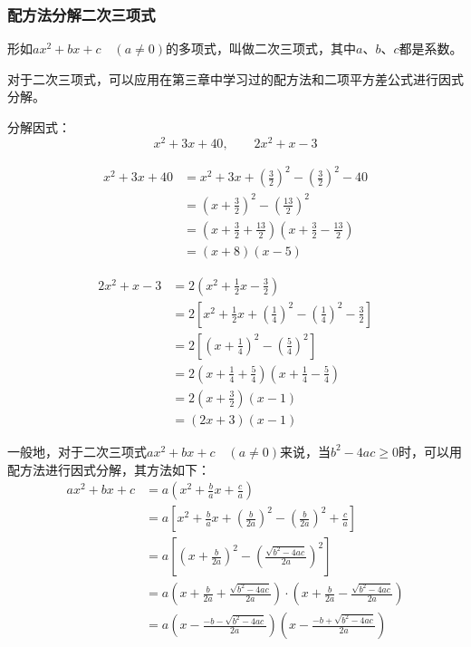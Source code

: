 \subsubsection{配方法分解二次三项式}
形如$ax^2+bx+c\quad (a\ne 0)$的多项式，叫做二次三项式，其中$a$、$b$、$c$都是系数。

对于二次三项式，可以应用在第三章中学习过的配方法和二项平方差公式进行因式分解。
\begin{example}
    分解因式：
\[x^2+3x+40,\qquad 2x^2+x-3\]
\end{example}

\begin{solution}
\[\begin{split}
    x^2+3x+40&=x^2+3x+\left(\frac{3}{2}\right)^2-\left(\frac{3}{2}\right)^2-40\\
    &=\left(x+\frac{3}{2}\right)^2-\left(\frac{13}{2}\right)^2\\
    &=\left(x+\frac{3}{2}+\frac{13}{2}\right)\left(x+\frac{3}{2}-\frac{13}{2}\right)\\
    &=(x+8)(x-5)
\end{split}\]

\[\begin{split}
    2x^2+x-3&=2\left(x^2+\frac{1}{2}x-\frac{3}{2}\right)\\
    &=2\left[x^2+\frac{1}{2}x+\left(\frac{1}{4}\right)^2-\left(\frac{1}{4}\right)^2-\frac{3}{2} \right]\\
    &=2\left[\left(x+\frac{1}{4}\right)^2-\left(\frac{5}{4}\right)^2\right]\\
    &=2\left(x+\frac{1}{4}+\frac{5}{4}\right)
   \left(x+\frac{1}{4}-\frac{5}{4}\right) \\
&=2\left(x+\frac{3}{2}\right)\left(x-1\right)\\
&=(2x+3)(x-1)
\end{split}\]
\end{solution}

一般地，对于二次三项式$ax^2+bx+c\quad (a\ne 0)$来说，当$b^2-4ac\ge 0$时，可以用配方法进行因式分解，其方法如下：
\[\begin{split}
    ax^2+bx+c &=a\left(x^2+\frac{b}{a}x+\frac{c}{a}\right)\\
    &=a\left[x^2+\frac{b}{a}x+\left(\frac{b}{2a}\right)^2-\left(\frac{b}{2a}\right)^2+\frac{c}{a}\right]\\
    &=a\left[\left(x+\frac{b}{2a}\right)^2-\left(\frac{\sqrt{b^2-4ac}}{2a}\right)^2\right]\\
    &=a\left(x+\frac{b}{2a}+\frac{\sqrt{b^2-4ac}}{2a}\right)\cdot \left(x+\frac{b}{2a}-\frac{\sqrt{b^2-4ac}}{2a}\right)\\
    &=a\left(x-\frac{-b-\sqrt{b^2-4ac}}{2a}\right)\left(x-\frac{-b+\sqrt{b^2-4ac}}{2a}\right)
\end{split}\]

